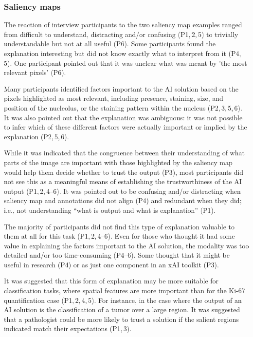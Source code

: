 \documentclass[final,5p,times,twocolumn,hyphens]{elsarticle}
\begin{document}
\subsubsection{Saliency maps}

The reaction of interview participants to the two saliency map examples ranged from difficult to understand, distracting and/or confusing (P1,\,2,\,5) to trivially understandable but not at all useful (P6). Some participants found the explanation interesting but did not know exactly what to interpret from it (P4,\,5). One participant pointed out that it was unclear what was meant by 'the most relevant pixels' (P6).

Many participants identified factors important to the AI solution based on the pixels highlighted as most relevant, including presence, staining, size, and position of the nucleolus, or the staining pattern within the nucleus (P2,\,3,\,5,\,6). It was also pointed out that the explanation was ambiguous: it was not possible to infer which of these different factors were actually important or implied by the explanation (P2,\,5,\,6).

While it was indicated that the congruence between their understanding of what parts of the image are important with those highlighted by the saliency map would help them decide whether to trust the output (P3), most participants did not see this as a meaningful means of establishing the trustworthiness of the AI output (P1,\,2,\,4--6). It was pointed out to be confusing and/or distracting when saliency map and annotations did not align (P4) and redundant when they did; i.e., not understanding “what is output and what is explanation” (P1). 

The majority of participants did not find this type of explanation valuable to them at all for this task (P1,\,2,\,4--6). Even for those who thought it had some value in explaining the factors important to the AI solution, the modality was too detailed and/or too time-consuming (P4--6). Some thought that it might be useful in research (P4) or as just one component in an xAI toolkit (P3).

It was suggested that this form of explanation may be more suitable for classification tasks, where spatial features are more important than for the Ki-67 quantification case (P1,\,2,\,4,\,5). For instance, in the case where the output of an AI solution is the classification of a tumor over a large region. It was suggested that a pathologist could be more likely to trust a solution if the salient regions indicated match their expectations (P1,\,3).
\end{document}
